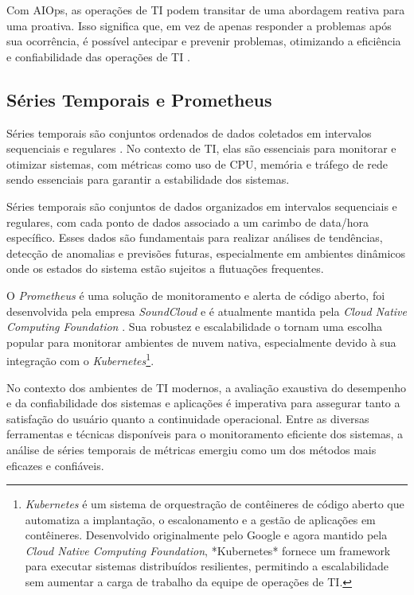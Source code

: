Com AIOps, as operações de TI podem transitar de uma abordagem reativa para uma proativa. Isso significa que, em vez de apenas responder a problemas após sua ocorrência, é possível antecipar e prevenir problemas, otimizando a eficiência e confiabilidade das operações de TI \cite{sill2019aiops}.

\subsection{Séries Temporais e Prometheus}
Séries temporais são conjuntos ordenados de dados coletados em intervalos sequenciais e regulares \cite{shumway2017time}. No contexto de TI, elas são essenciais para monitorar e otimizar sistemas, com métricas como uso de CPU, memória e tráfego de rede sendo essenciais para garantir a estabilidade dos sistemas.

Séries temporais são conjuntos de dados organizados em intervalos sequenciais e regulares, com cada ponto de dados associado a um carimbo de data/hora específico. Esses dados são fundamentais para realizar análises de tendências, detecção de anomalias e previsões futuras, especialmente em ambientes dinâmicos onde os estados do sistema estão sujeitos a flutuações frequentes.

O \textit{Prometheus} é uma solução de monitoramento e alerta de código aberto, foi desenvolvida pela empresa \textit{SoundCloud} e é atualmente mantida pela \textit{Cloud Native Computing Foundation} \cite{brazil2019prometheus}. Sua robustez e escalabilidade o tornam uma escolha popular para monitorar ambientes de nuvem nativa, especialmente devido à sua integração com o \textit{Kubernetes}\footnote{\textit{Kubernetes} é um sistema de orquestração de contêineres de código aberto que automatiza a implantação, o escalonamento e a gestão de aplicações em contêineres. Desenvolvido originalmente pelo Google e agora mantido pela \textit{Cloud Native Computing Foundation}, *Kubernetes* fornece um framework para executar sistemas distribuídos resilientes, permitindo a escalabilidade sem aumentar a carga de trabalho da equipe de operações de TI.}.

No contexto dos ambientes de TI modernos, a avaliação exaustiva do desempenho e da confiabilidade dos sistemas e aplicações é imperativa para assegurar tanto a satisfação do usuário quanto a continuidade operacional. Entre as diversas ferramentas e técnicas disponíveis para o monitoramento eficiente dos sistemas, a análise de séries temporais de métricas emergiu como um dos métodos mais eficazes e confiáveis.


